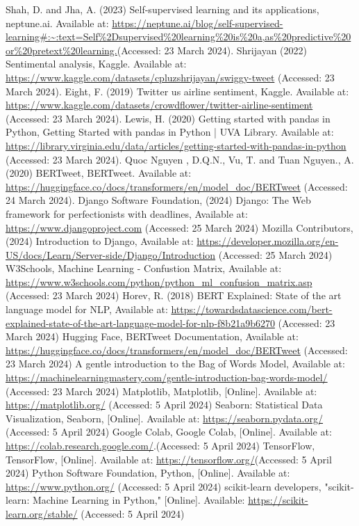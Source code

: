\documentclass[conference]{IEEEtran}
\begin{document}
\begin{thebibliography}{00}
 Shah, D. and Jha, A. (2023) Self-supervised learning and its applications, neptune.ai. Available at: \url{https://neptune.ai/blog/self-supervised-learning#:~:text=Self%2Dsupervised%20learning%20is%20a,as%20predictive%20or%20pretext%20learning.}(Accessed: 23 March 2024). 
 Shrijayan (2022) Sentimental analysis, Kaggle. Available at: \url{ https://www.kaggle.com/datasets/cpluzshrijayan/swiggy-tweet} (Accessed: 23 March 2024).  
 Eight, F. (2019) Twitter us airline sentiment, Kaggle. Available at: \url{https://www.kaggle.com/datasets/crowdflower/twitter-airline-sentiment} (Accessed: 23 March 2024). 
 Lewis, H. (2020) Getting started with pandas in Python, Getting Started with pandas in Python | UVA Library. Available at: \url{https://library.virginia.edu/data/articles/getting-started-with-pandas-in-python} (Accessed: 23 March 2024). 
 Quoc Nguyen , D.Q.N.,  Vu, T. and Tuan Nguyen., A. (2020) BERTweet, BERTweet. Available at: \url{https://huggingface.co/docs/transformers/en/model_doc/BERTweet} (Accessed: 24 March 2024). 
 Django Software Foundation, (2024) Django: The Web framework for perfectionists with deadlines, Available at: \url{https://www.djangoproject.com} (Accessed: 25 March 2024)
 Mozilla Contributors, (2024) Introduction to Django, Available at: \url{https://developer.mozilla.org/en-US/docs/Learn/Server-side/Django/Introduction} (Accessed: 25 March 2024)
 W3Schools, Machine Learning - Confustion Matrix, Available at: \url{https://www.w3schools.com/python/python_ml_confusion_matrix.asp} (Accessed: 23 March 2024)
 Horev, R. (2018) BERT Explained: State of the art language model for NLP, Available at: \url{https://towardsdatascience.com/bert-explained-state-of-the-art-language-model-for-nlp-f8b21a9b6270} (Accessed: 23 March 2024)
 Hugging Face, BERTweet Documentation, Available at: \url{https://huggingface.co/docs/transformers/en/model_doc/BERTweet} (Accessed: 23 March 2024)
 A gentle introduction to the Bag of Words Model, Available at: \url{https://machinelearningmastery.com/gentle-introduction-bag-words-model/} (Accessed: 23 March 2024)
 Matplotlib, Matplotlib, [Online]. Available at: \url{https://matplotlib.org/} (Accessed: 5 April 2024)
 Seaborn: Statistical Data Visualization, Seaborn, [Online]. Available at: \url{https://seaborn.pydata.org/} (Accessed: 5 April 2024)
 Google Colab, Google Colab, [Online]. Available at: \url{https://colab.research.google.com/}.(Accessed: 5 April 2024)
 TensorFlow, TensorFlow, [Online]. Available at: \url{https://tensorflow.org/}(Accessed: 5 April 2024)
 Python Software Foundation, Python, [Online]. Available at: \url{https://www.python.org/} (Accessed: 5 April 2024)
 scikit-learn developers, "scikit-learn: Machine Learning in Python," [Online]. Available: \url{https://scikit-learn.org/stable/} (Accessed: 5 April 2024)
\end{thebibliography}
\vspace{12pt}
\end{document}

